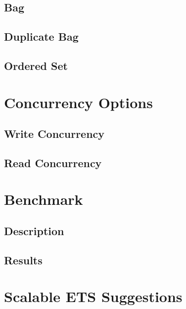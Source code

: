 \documentclass[aps,pre,preprint,nofootinbib]{revtex4}
\begin{document}
\subsection{Bag}
\subsection{Duplicate Bag}
\subsection{Ordered Set}


\section{Concurrency Options} \label{sec:concurrency_options}

\subsection{Write Concurrency}

\subsection{Read Concurrency}


\section{Benchmark} \label{sec:benchmark}

\subsection{Description}

\subsection{Results}


\section{Scalable ETS Suggestions}

\begin{thebibliography}{9}
\end{thebibliography}
\end{document}
